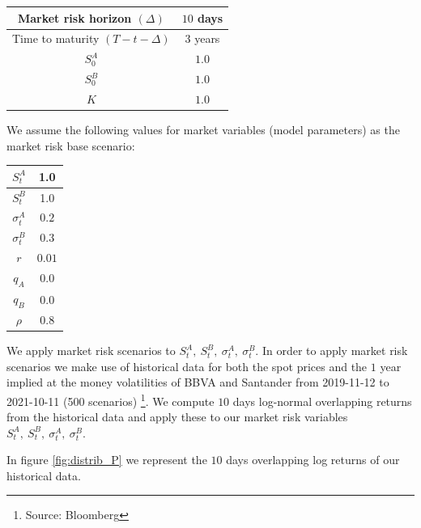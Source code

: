\begin{center}
\begin{tabular}{||c | c||} 
 \hline
 Market risk horizon $(\Delta)$ & $10$ days \\ 
 \hline
 Time to maturity $(T-t-\Delta)$ & $3$ years \\
 \hline
 $S_0^A$ & $1.0$ \\
 \hline
 $S_0^B$ & $1.0$ \\
 \hline
 $K$ & $1.0$ \\
 \hline
 \end{tabular}
\end{center}

We assume the following values for market variables (model parameters) as the market risk base scenario:

\begin{center}
\begin{tabular}{||c | c||} 
 \hline
 $S_t^A$ & 1.0 \\
 \hline
 $S_t^B$ & 1.0 \\
 \hline
 $\sigma_t^A$ & $0.2$ \\
 \hline
 $\sigma_t^B$ & $0.3$ \\
 \hline
 $r$ & $0.01$ \\
 \hline
 $q_A$ & $0.0$ \\
 \hline
 $q_B$ & $0.0$ \\
 \hline
 $\rho$ & $0.8$ \\
 \hline
\end{tabular}
\end{center}

We apply market risk scenarios to $S_t^A,\ S_t^B,\ \sigma_t^A,\ \sigma_t^B$.
In order to apply market risk scenarios we make use of historical data for both the spot prices and the $1$ year  implied at the money volatilities of BBVA and Santander from 2019-11-12 to 2021-10-11 (500 scenarios) \footnote{Source: Bloomberg}. We compute $10$ days log-normal overlapping returns from the historical data and apply these to our market risk variables $S_t^A,\ S_t^B,\ \sigma_t^A,\ \sigma_t^B$.


In figure \ref{fig:distrib_P} we represent the $10$ days overlapping log returns of our historical data.

